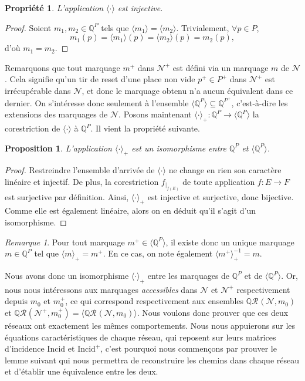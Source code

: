 \documentclass{article}
\newtheorem{property}{Propriété}
\newtheorem{proposition}{Proposition}
\theoremstyle{remark}
\newtheorem*{remark}{Remarque}
\theoremstyle{remark}
\newcommand{\reach}[3][]{\mathcal{R}^{#1}(\mathcal{#2}, #3)}
\newcommand{\creach}[3][]{\mathbb{Q}\reach[#1]{#2}{#3}}
\newcommand{\restrict}[2]{#1_{|_{#2}}}
\newcommand{\extend}[1][\cdot]{\langle #1 \rangle}
\newcommand{\coextend}[1][\cdot]{\extend[#1]_+}
\newcommand{\rcoextend}[1][\cdot]{\coextend[#1]^{-1}}
\newcommand{\prototype}[3]{#1 : #2 \rightarrow #3}
\newcommand{\incid}{\mathrm{Incid}}
\begin{document}
\begin{property}
    L'application $\extend[\cdot]$ est injective.
\end{property}

\begin{proof}
    Soient $m_1, m_2 \in \mathbb{Q}^P$ tels que $\extend[m_1] = \extend[m_2]$.
    Trivialement, $\forall p \in P$, \[m_1(p) = \extend[m_1](p) = \extend[m_2](p) = m_2(p),\] d'où $m_1 = m_2$.
\end{proof}

Remarquons que tout marquage $m^+$ dans $\mathcal{N}^+$ est défini via un marquage $m$ de $\mathcal{N}$. Cela signifie qu'un tir de reset d'une place non vide $p^+ \in P^+$ dans $\mathcal{N^+}$ est irrécupérable dans $\mathcal{N}$, et donc le marquage obtenu n'a aucun équivalent dans ce dernier. On s'intéresse donc seulement à l'ensemble $\extend[\mathbb{Q}^P] \subseteq \mathbb{Q}^{P^+}$, c'est-à-dire les extensions des marquages de $\mathcal{N}$. Posons maintenant $\prototype{\coextend}{\mathbb{Q}^P}{\extend[\mathbb{Q}^P]}$ la corestriction de $\extend$ à $\mathbb{Q}^P$. Il vient la propriété suivante.

\begin{proposition}
    L'application $\coextend$ est un isomorphisme entre $\mathbb{Q}^P$ et $\extend[\mathbb{Q}^P]$.
\end{proposition}

\begin{proof}
    Restreindre l'ensemble d'arrivée de $\extend$ ne change en rien son caractère linéaire et injectif. De plus, la corestriction $\restrict{f}{f(E)}$ de toute application $\prototype{f}{E}{F}$ est surjective par définition. Ainsi, $\coextend$ est injective et surjective, donc bijective. Comme elle est également linéaire, alors on en déduit qu'il s'agit d'un isomorphisme.
\end{proof}

\begin{remark}
    Pour tout marquage $m^+ \in \extend[\mathbb{Q}^P]$, il existe donc un unique marquage $m \in \mathbb{Q}^P$ tel que $\coextend[m] = m^+$. En ce cas, on note également $\rcoextend[m^+] = m$.
\end{remark}

Nous avons donc un isomorphisme $\coextend$ entre les marquages de $\mathbb{Q}^P$ et de $\extend[\mathbb{Q}^P]$. Or, nous nous intéressons aux marquages \textit{accessibles} dans $\mathcal{N}$ et $\mathcal{N}^+$ respectivement depuis $m_0$ et $m_0^+$, ce qui correspond respectivement aux ensembles $\creach{N}{m_0}$ et $\creach{N^+}{m_0^+} = \extend[\creach{N}{m_0}]$. Nous voulons donc prouver que ces deux réseaux ont exactement les mêmes comportements. Nous nous appuierons sur les équations caractéristiques de chaque réseau, qui reposent sur leurs matrices d'incidence $\incid$ et $\incid^+$, c'est pourquoi nous commençons par prouver le lemme suivant qui nous permettra de reconstruire les chemins dans chaque réseau et d'établir une équivalence entre les deux.
\end{document}
